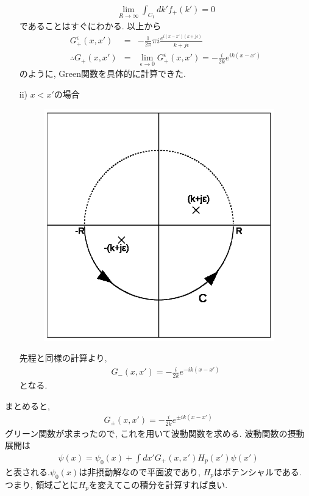 \documentclass[10.5pt,a4paper]{jreport}
\begin{document}
\begin{itemize}
\begin{eqnarray}
    \lim_{R\rightarrow\infty}\int_{C_1}dk'f_+(k') =0
  \end{eqnarray}
  であることはすぐにわかる. 以上から
  \begin{eqnarray}
    G^\epsilon_+(x, x') &=& -\frac{1}{2\pi}\pi i\frac{e^{i(x-x')(k+j\epsilon)}}{k+j\epsilon}\\
    \therefore G_+(x, x') &=& \lim_{\epsilon\rightarrow 0}G_+^\epsilon(x, x') = -\frac{i}{2k}e^{ik(x-x')}
  \end{eqnarray}
  のように, Green関数を具体的に計算できた.\\
\item[ii)] $x<x'$の場合    
  \begin{figure}[htbp]
    \centering
    \includegraphics[width = 10cm]{./EPS/figure2new.eps}
    \label{fig2}
  \end{figure}
  先程と同様の計算より,
  \begin{eqnarray}
    G_-(x, x') = -\frac{i}{2k}e^{-ik(x-x')}
  \end{eqnarray}
  となる. 
\end{itemize}
まとめると,
\begin{eqnarray}
  G_\pm(x, x') = -\frac{i}{2k}e^{\pm ik(x-x')}
\end{eqnarray}
グリーン関数が求まったので, これを用いて波動関数を求める. 波動関数の摂動展開は
\begin{eqnarray}
  \psi(x) = \psi_0(x) + \int dx'G_+(x, x')H_p(x')\psi(x')
\end{eqnarray}
と表される.$\psi_0(x)$は非摂動解なので平面波であり, $H_p$はポテンシャルである. つまり, 領域ごとに$H_p$を変えてこの積分を計算すれば良い.
\end{document}
